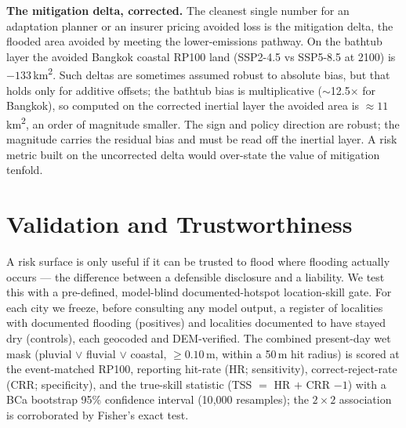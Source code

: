 \documentclass[11pt,a4paper]{article}
\begin{document}
\textbf{The mitigation delta, corrected.} The cleanest single number for an adaptation planner or an insurer pricing avoided loss is the mitigation delta, the flooded area avoided by meeting the lower-emissions pathway. On the bathtub layer the avoided Bangkok coastal RP100 land (SSP2-4.5 vs SSP5-8.5 at 2100) is $-133$\,km\textsuperscript{2}. Such deltas are sometimes assumed robust to absolute bias, but that holds only for additive offsets; the bathtub bias is multiplicative ($\sim$12.5$\times$ for Bangkok), so computed on the corrected inertial layer the avoided area is ${\approx}11$\,km\textsuperscript{2}, an order of magnitude smaller. The sign and policy direction are robust; the magnitude carries the residual bias and must be read off the inertial layer. A risk metric built on the uncorrected delta would over-state the value of mitigation tenfold.

\section{Validation and Trustworthiness}
\label{sec:validation}
A risk surface is only useful if it can be trusted to flood where flooding actually occurs --- the difference between a defensible disclosure and a liability. We test this with a pre-defined, model-blind documented-hotspot location-skill gate. For each city we freeze, before consulting any model output, a register of localities with documented flooding (positives) and localities documented to have stayed dry (controls), each geocoded and DEM-verified. The combined present-day wet mask (pluvial $\vee$ fluvial $\vee$ coastal, $\geq 0.10$\,m, within a 50\,m hit radius) is scored at the event-matched RP100, reporting hit-rate (HR; sensitivity), correct-reject-rate (CRR; specificity), and the true-skill statistic (TSS $=$ HR $+$ CRR $- 1$) with a BCa bootstrap 95\% confidence interval (10{,}000 resamples); the $2\times2$ association is corroborated by Fisher's exact test.
\end{document}
